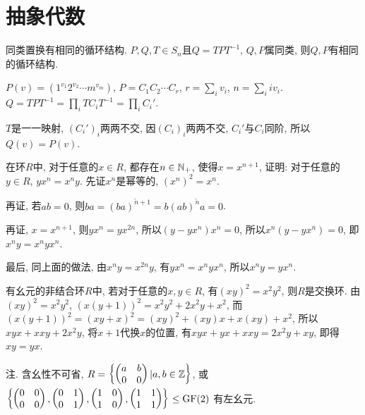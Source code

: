 \chapter{抽象代数}
\bt{}{}
同类置换有相同的循环结构.
\et
\ba
$P,Q,T\in S_n$且$Q=TPT^{-1}$, $Q,P$属同类, 则$Q,P$有相同的循环结构.

$P(v)=(1^{v_1}2^{v_2}\cdots m^{v_m})$, $P=C_1C_2\cdots C_r$, $r=\sum_iv_i$, $n=\sum_iiv_i$.
$Q=TPT^{-1}=\prod_iTC_iT^{-1}=\prod_iC_i'$. 

$T$是一一映射, $(C_i')_i$两两不交, 因$(C_i)_i$两两不交,
$C_i'$与$C_i$同阶, 所以$Q(v)=P(v)$.
\ea

\bq{}{}
在环$R$中, 对于任意的$x\in R$, 都存在$n\in\mathbb{N}_{+}$, 使得$x=x^{n+1}$, 证明: 对于任意的$y\in R$, $yx^n=x^ny$.
\eq
\ba
先证$x^n$是幂等的, $(x^n)^2=x^n$.

再证, 若$ab=0$, 则$ba=(ba)^{\tilde{n}+1}=b(ab)^{\tilde{n}}a=0$.

再证, $x=x^{n+1}$, 则$yx^n=yx^{2n}$, 所以$(y-yx^n)x^n=0$, 所以$x^n(y-yx^n)=0$, 即$x^ny=x^nyx^n$.

最后, 同上面的做法, 由$x^ny=x^{2n}y$, 有$yx^n=x^nyx^n$, 所以$x^ny=yx^n$.
\ea

有幺元的非结合环$R$中, 若对于任意的$x,y\in R$, 有$(xy)^2=x^2y^2$, 则$R$是交换环.
\eq
\ba
由$(xy)^2=x^2y^2$, $(x(y+1))^2=x^2y^2+2x^2y+x^2$, 而$(x(y+1))^2=(xy+x)^2=(xy)^2+(xy)x+x(xy)+x^2$, 
所以$xyx+xxy+2x^2y$, 将$x+1$代换$x$的位置, 有$xyx+yx+xxy=2x^2y+xy$, 即得$xy=yx$.

注. 含幺性不可省, $R=\left\{
\begin{pmatrix}
 a & b\\
 0 & 0
\end{pmatrix}
\vert
a,b\in\mathbb{Z}
\right\}$, 或$\left\{
\begin{pmatrix}
 0 & 0\\
 0 & 0
\end{pmatrix},
\begin{pmatrix}
 0 & 1\\
 0 & 1
\end{pmatrix},
\begin{pmatrix}
 1 & 0\\
 1 & 0
\end{pmatrix},
\begin{pmatrix}
 1 & 1\\
 1 & 1
\end{pmatrix}
\right\}\le \mathrm{GF}(2)$
有左幺元.

